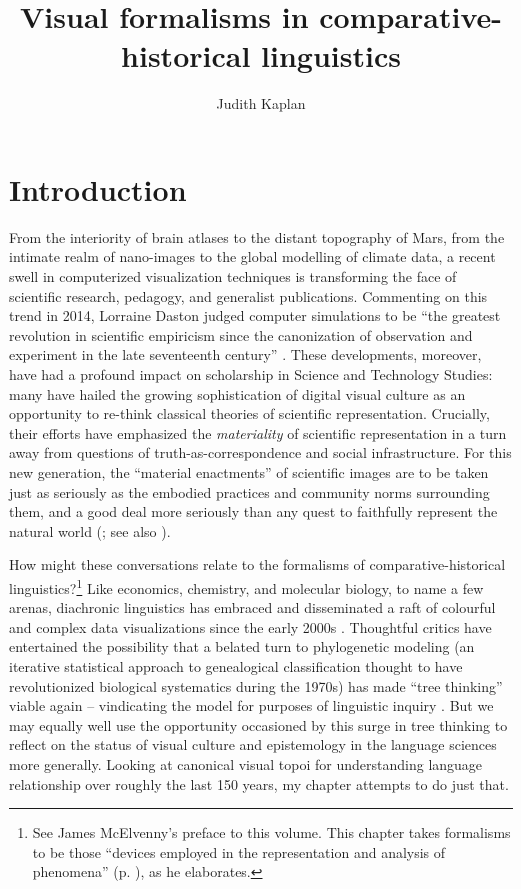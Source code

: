 \documentclass[output=paper]{langscibook}
\author{Judith Kaplan\affiliation{University of Pennsylvania}}
\title{Visual formalisms in comparative-historical linguistics}
\begin{document}
\maketitle

\section{Introduction}
\label{sec:kaplan:intro}

From the interiority of brain atlases to the distant topography of Mars, from the intimate realm of nano-images to the global modelling of climate data, a recent swell in  computerized visualization techniques is transforming the face of scientific research, pedagogy, and generalist publications. Commenting on this trend in 2014, Lorraine Daston judged computer simulations to be ``the greatest revolution in scientific empiricism since the canonization of observation and experiment in the late seventeenth century'' \citep[321]{Daston2014}. These developments, moreover, have had a profound impact on scholarship in Science and Technology Studies: many have hailed the growing sophistication of digital visual culture as an opportunity to re-think classical theories of scientific representation. Crucially, their efforts have emphasized the \emph{materiality} of scientific representation in a turn away from questions of truth-as-correspondence and social infrastructure. For this new generation, the ``material enactments'' of scientific images are to be taken just as seriously as the embodied practices and community norms surrounding them, and a good deal more seriously than any quest to faithfully represent the natural world (\citealt[3]{Coopmansetal2014}; see also \citealt{Kusukawa2016}).

How might these conversations relate to the formalisms of comparative-historical linguistics?\footnote{See James McElvenny's preface to this volume. This chapter takes formalisms to be those ``devices employed in the representation and analysis of phenomena'' (p. \pageref{p:pref:devices}), as he elaborates.} Like economics, chemistry, and molecular biology, to name a few arenas, diachronic linguistics has embraced and disseminated a raft of colourful and complex data visualizations since the early 2000s \citep[see, e.g., ][]{GrayDrummondGreenhill2009}. Thoughtful critics have entertained the possibility that a belated turn to phylogenetic modeling (an iterative statistical approach to genealogical classification thought to have revolutionized biological systematics during the 1970s) has made ``tree thinking'' viable again – vindicating the model for purposes of linguistic inquiry \citep{Lopez2013}. But we may equally well use the opportunity occasioned by this surge in tree thinking to reflect on the status of visual culture and epistemology in the language sciences more generally. Looking at canonical visual topoi for understanding language relationship over roughly the last 150 years, my chapter attempts to do just that.
\end{document}
